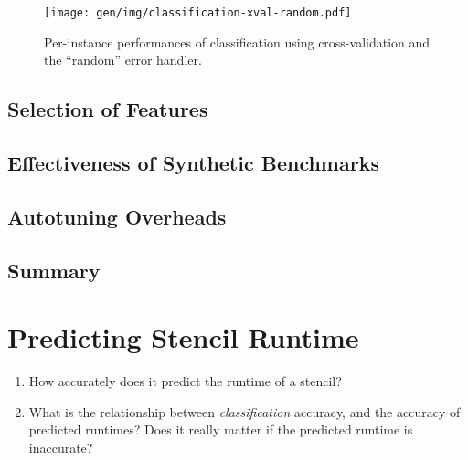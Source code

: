 \begin{figure}
\centering
\texttt{[image: gen/img/classification-xval-random.pdf]}
\caption{%
  Per-instance performances of classification using cross-validation
  and the ``random'' error handler.%
}
\end{figure}




\subsection{Selection of Features}



\subsection{Effectiveness of Synthetic Benchmarks}




\subsection{Autotuning Overheads}



\subsection{Summary}


\section{Predicting Stencil Runtime}

\begin{enumerate}
\item How accurately does it predict the runtime of a stencil?
\item What is the relationship between \emph{classification} accuracy,
  and the accuracy of predicted runtimes? Does it really matter if the
  predicted runtime is inaccurate?
\end{enumerate}

